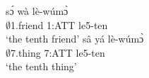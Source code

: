 \begin{exe}
\ex\label{Ordten}
\begin{xlist}
\ex \label{Ordten1}
  \gll   sɔ́ wà lè-wúmɔ̀ \\
                $\emptyset$1.friend 1:ATT le5-ten \\
    \trans `the tenth friend'
\ex\label{Ordten4}
 \gll  sâ yá lè-wúmɔ̀ \\
              $\emptyset$7.thing 7:ATT le5-ten \\
    \trans `the tenth thing'
\end {xlist}
\end {exe}






